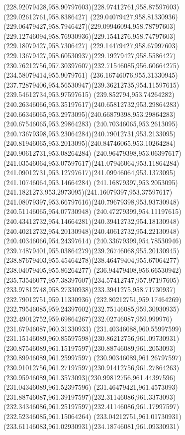 {{\curveto(228.92079428,958.90797603)(228.97412761,958.87597603)(229.02612761,958.8386427)
\curveto(229.04079427,958.81330936)(229.06479427,958.7946427)(229.09946094,958.78797603)
\curveto(229.12746094,958.76930936)(229.1541276,958.74797603)(229.18079427,958.7306427)
\curveto(229.14479427,958.67997603)(229.13679427,958.60530937)(229.19279427,958.5586427)
\curveto(230.76212756,957.30397607)(232.71546085,956.60664275)(234.58079414,955.9079761)
\curveto(236.16746076,955.31330945)(237.72879406,954.56530947)(239.36212735,954.11597615)
\lineto(239.54612734,953.97597615)
\curveto(239.852794,953.74264282)(240.26346066,953.35197617)(240.65812732,953.29864283)
\curveto(240.66346065,953.2973095)(240.66879398,953.29864283)(240.67546065,953.29864283)
\curveto(240.70346065,953.2613095)(240.73679398,953.23064284)(240.79012731,953.2133095)
\curveto(240.81946065,953.2013095)(240.84746065,953.10264284)(240.90612731,953.08264284)
\curveto(240.96479398,953.06397617)(241.03546064,953.07597617)(241.07946064,953.11864284)
\curveto(241.09012731,953.12797617)(241.09946064,953.1373095)(241.10746064,953.14664284)
\curveto(241.16879397,953.2053095)(241.1821273,953.2973095)(241.16079397,953.37597617)
\curveto(241.08079397,953.66797616)(240.79679398,953.93730948)(240.51146065,954.07730948)
\curveto(240.47279399,954.11197615)(240.43412732,954.14664281)(240.39412732,954.18130948)
\curveto(240.40212732,954.20130948)(240.40612732,954.22130948)(240.40346066,954.24397614)
\curveto(240.33679399,954.78530946)(239.74879401,955.03864279)(239.26746068,955.20130945)
\curveto(238.87679403,955.45464278)(238.46479404,955.67064277)(238.04079405,955.86264277)
\curveto(236.94479408,956.66530942)(235.73546077,957.38397607)(234.57412747,957.97197605)
\curveto(233.97812748,958.27330938)(233.3941275,958.71730937)(232.79012751,959.11330936)
\curveto(232.80212751,959.17464269)(232.79546085,959.24397602)(232.75146085,959.30930935)
\curveto(232.49012752,959.69864267)(232.02746087,959.999976)(231.67946087,960.31330933)
\curveto(231.40346088,960.55997599)(231.15146089,960.85597598)(230.86212756,961.09730931)
\curveto(230.87546089,961.15197597)(230.88746089,961.2053093)(230.89946089,961.25997597)
\curveto(230.90346089,961.26797597)(230.91012756,961.27197597)(230.91412756,961.27864263)
\curveto(230.95946089,961.3573093)(230.99812756,961.44397596)(231.04346089,961.52397596)
\curveto(231.46479421,961.4573093)(231.88746087,961.39197597)(232.31146086,961.3373093)
\curveto(232.34346086,961.25197597)(232.41146086,961.17997597)(232.52346085,961.15064264)
\curveto(233.04212751,961.01730931)(233.61146083,961.02930931)(234.18746081,961.09330931)
}}
